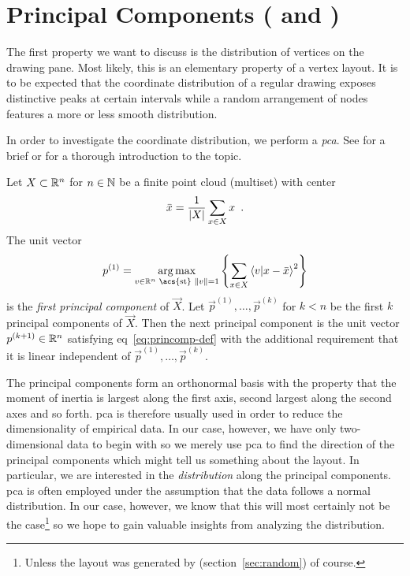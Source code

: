\documentclass{graphstudy}
\begin{document}
\section{Principal Components ( and )}
\label{sec:princomp}

The first property we want to discuss is the distribution of vertices on the drawing pane.  Most likely, this is an
elementary property of a vertex layout.  It is to be expected that the coordinate distribution of a regular drawing
exposes distinctive peaks at certain intervals while a random arrangement of nodes features a more or less smooth
distribution.

In order to investigate the coordinate distribution, we perform a \emph{\ac{pca}}.  See \textcite{Abdi2010} for a brief
or \textcite{Jolliffe2002} for a thorough introduction to the topic.

\begin{definition}
  Let \(\Vec{X}\subset\Reals^n\) for \(n\in\mathbb{N}\) be a finite point cloud (multiset) with center
  \begin{equation}
    \bar{\relax{x}} = \frac{1}{\left\lvert\relax{X}\right\rvert} \sum_{\relax{x}\in\relax{X}} \relax{x}
    \enspace.
  \end{equation}
  The unit vector
  \begin{equation}
    \label{eq:princomp-def}
    \vec{p}^{(1)} =
    \argmax_{\vec{v}\in\Reals^n\text{~\acs{st}~}\vecnorm{\vec{v}}=1}
    \left\{ \sum_{\vec{x}\in\Vec{X}} \braket{\vec{v}}{\vec{x}-\bar{\vec{x}}}^2 \right\}
  \end{equation}
  is the \emph{first principal component} of \(\Vec{X}\).  Let \(\vec{p}^{(1)},\ldots,\vec{p}^{(k)}\) for \(k<n\) be the
  first \(k\) principal components of \(\Vec{X}\).  Then the next principal component is the unit vector
  \(\vec{p}^{(k+1)}\in\Reals^n\) satisfying \acl{eq}~\ref{eq:princomp-def} with the additional requirement that it is
  linear independent of \(\vec{p}^{(1)},\ldots,\vec{p}^{(k)}\).
  \label{def:princomp}
\end{definition}

The principal components form an orthonormal basis with the property that the moment of inertia is largest along the
first axis, second largest along the second axes and so forth.  \Ac{pca} is therefore usually used in order to reduce
the dimensionality of empirical data.  In our case, however, we have only two-dimensional data to begin with so we
merely use \ac{pca} to find the direction of the principal components which might tell us something about the layout.
In particular, we are interested in the \emph{distribution} along the principal components.  \Ac{pca} is often employed
under the assumption that the data follows a normal distribution.  In our case, however, we know that this will most
certainly not be the case\footnote{%
  Unless the layout was generated by  (\acs{section}~\ref{sec:random}) of course.
}
so we hope to gain valuable insights from analyzing the distribution.
\end{document}

